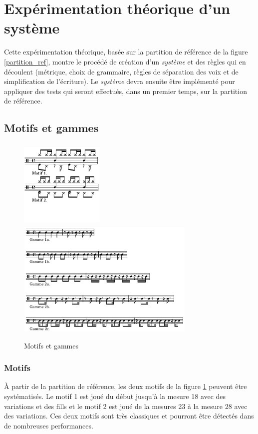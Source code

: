 \section{Expérimentation théorique d’un système}
\label{expe_theo}
Cette expérimentation théorique, basée sur la partition de référence de la figure \ref{partition_ref}, montre le procédé de création d’un \textit{système} et des règles qui en découlent (métrique, choix de grammaire, règles de séparation des voix et de simplification de l’écriture). Le \textit{système} devra ensuite être implémenté pour appliquer des tests qui seront effectués, dans un premier temps, sur la partition de référence.
\subsection*{Motifs et gammes}
\begin{figure}[h]
	\centering
	\includegraphics[height=43mm, width=40mm]{z_images/4_experimentations/2_experimentation_theorique/0_motifs_4-4_binaires.png}
	\includegraphics[height=55mm, width=85mm]{z_images/4_experimentations/2_experimentation_theorique/1_gammes_4-4_binaires.png}
	\caption{Motifs et gammes}
	\label{motifs_gammes}
\end{figure}
\subsubsection{Motifs}
À partir de la partition de référence, les deux motifs de la figure \ref{motifs_gammes} peuvent être systématisés. Le motif 1 est joué du début jusqu’à la mesure 18 avec des variations et des fills et le motif 2 est joué de la mesures 23 à la mesure 28 avec des variations. Ces deux motifs sont très classiques et pourront être détectés dans de nombreuses performances.\\
